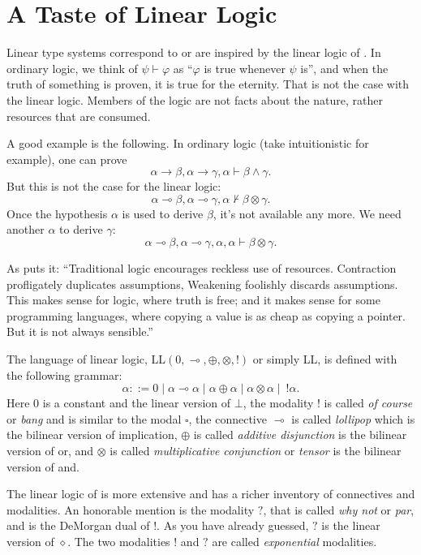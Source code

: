\section{A Taste of Linear Logic}

Linear type systems correspond to or are inspired by the linear logic of \cite{DBLP:journals/tcs/Girard87}. In ordinary logic, we think of $\psi \vdash \varphi$ as ``$\varphi$ is true whenever $\psi$ is'', and when the truth of something is proven, it is true for the eternity. That is not the case with the linear logic. Members of the logic are not facts about the nature, rather resources that are consumed.

A good example is the following. In ordinary logic (take intuitionistic for example), one can prove
\[
\alpha \rightarrow \beta, \alpha \rightarrow \gamma, \alpha \vdash \beta \wedge \gamma.
\]
But this is not the case for the linear logic:
\[
\alpha \multimap \beta, \alpha \multimap \gamma, \alpha \not\vdash \beta \otimes \gamma.
\]
Once the hypothesis $\alpha$ is used to derive $\beta$, it's not available any more. We need another $\alpha$ to derive $\gamma$:
\[
\alpha \multimap \beta, \alpha \multimap \gamma, \alpha, \alpha \vdash \beta \otimes \gamma.
\]

As \cite{DBLP:conf/mfcs/Wadler93} puts it: ``Traditional logic encourages reckless use of resources. Contraction profligately duplicates assumptions, Weakening foolishly discards assumptions. This makes sense for logic, where truth is free; and it makes sense for some programming languages, where copying a value is as cheap as copying a pointer. But it is not always sensible.''

The language of linear logic, LL$(0, \multimap, \oplus, \otimes, !)$ or simply LL, is defined with the following grammar:
\[
\alpha ::= 0 \mid \alpha \multimap \alpha \mid \alpha \oplus \alpha \mid \alpha \otimes \alpha \mid~ !\alpha.
\]
Here $0$ is a constant and the linear version of $\bot$, the modality $!$ is called \textit{of course} or \textit{bang} and is similar to the modal $\square$, the connective $\multimap$ is called \textit{lollipop} which is the bilinear version of implication, $\oplus$ is called \textit{additive disjunction} is the bilinear version of or, and $\otimes$ is called \textit{multiplicative conjunction} or \textit{tensor} is the bilinear version of and.

The linear logic of \cite{DBLP:journals/tcs/Girard87} is more extensive and has a richer inventory of connectives and modalities. An honorable mention is the modality $?$, that is called \textit{why not} or \textit{par}, and is the DeMorgan dual of $!$. As you have already guessed, $?$ is the linear version of $\diamond$. The two modalities $!$ and $?$ are called \textit{exponential} modalities.
